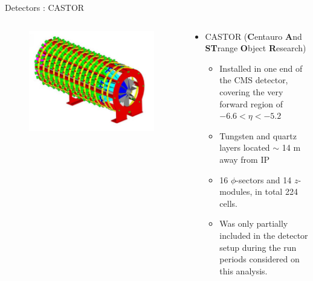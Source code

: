 \documentclass[aspectratio=169,xcolor=dvipsnames]{beamer}
\begin{document}
\begin{frame}{Detectors : CASTOR}
	\begin{columns}
		\begin{column}{.35\textwidth}
			\begin{figure}
				\centering
				\includegraphics[width=0.7\linewidth]{screenshot003}
			\end{figure}
		\end{column}
		\begin{column}{.65\textwidth}
			\begin{itemize}
				\item CASTOR (\textbf{C}entauro \textbf{A}nd \textbf{ST}range \textbf{O}bject \textbf{R}esearch)
				\begin{itemize}
					\item Installed in one end of the CMS detector, covering the very forward region of $-6.6 < \eta < -5.2$
					\item Tungsten and quartz layers located  $\sim$ 14 m away from IP
					\item 16 $\phi$-sectors and 14 $z$-modules, in total 224 cells.
					\item Was only partially included in the detector setup during the run periods considered on this analysis. 
				\end{itemize}
			\end{itemize}
		\end{column}
	\end{columns}
\end{frame}
\end{document}
